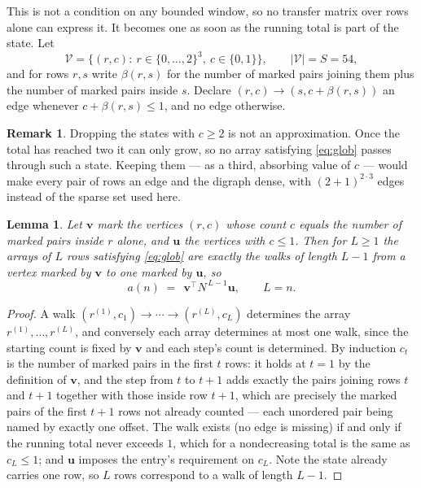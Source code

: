 \documentclass[11pt,a4paper]{article}
\theoremstyle{plain}
\newtheorem{lemma}[theorem]{Lemma}
\theoremstyle{definition}
\newtheorem{remark}[theorem]{Remark}
\begin{document}
This is not a condition on any bounded window, so no transfer matrix over rows alone can
express it. It becomes one as soon as the running total is part of the state. Let
\[
\mathcal V=\bigl\{(r,c):\ r\in\{0,\dots,2\}^{3},\ c\in\{0,1\}\bigr\},
\qquad |\mathcal V|=S=54,
\]
and for rows $r,s$ write $\beta(r,s)$ for the number of marked pairs joining them plus the
number of marked pairs inside $s$. Declare $(r,c)\to(s,c+\beta(r,s))$ an edge whenever
$c+\beta(r,s)\le1$, and no edge otherwise.

\begin{remark}
Dropping the states with $c\ge2$ is not an approximation. Once the total has reached two it
can only grow, so no array satisfying \eqref{eq:glob} passes through such a state. Keeping
them --- as a third, absorbing value of $c$ --- would make every pair of rows an edge and
the digraph dense, with $(2+1)^{2\cdot3}$ edges instead of the sparse set used here.
\end{remark}

\begin{lemma}\label{lem:walk}
Let $\mathbf{v}$ mark the vertices $(r,c)$ whose count $c$ equals the number of marked pairs
inside $r$ alone, and $\mathbf{u}$ the vertices with $c\le1$. Then for $L\ge1$ the arrays
of $L$ rows satisfying \eqref{eq:glob} are exactly the walks of length $L-1$ from a
vertex marked by $\mathbf{v}$ to one marked by $\mathbf{u}$, so
\[
a(n)\;=\;\,\mathbf{v}^{\!\top}N^{\,L-1}\mathbf{u},\qquad L=n .
\]
\end{lemma}

\begin{proof}
A walk $(r^{(1)},c_1)\to\cdots\to(r^{(L)},c_L)$ determines the array
$r^{(1)},\dots,r^{(L)}$, and conversely each array determines at most one walk, since the
starting count is fixed by $\mathbf{v}$ and each step's count is determined. By induction
$c_t$ is the number of marked pairs in the first $t$ rows: it holds at $t=1$ by the
definition of $\mathbf{v}$, and the step from $t$ to $t+1$ adds exactly the pairs joining
rows $t$ and $t+1$ together with those inside row $t+1$, which are precisely the marked
pairs of the first $t+1$ rows not already counted --- each unordered pair being named by
exactly one offset. The walk exists (no edge is missing) if and only if the running total
never exceeds $1$, which for a nondecreasing total is the same as $c_L\le1$; and
$\mathbf{u}$ imposes the entry's requirement on $c_L$. Note the state already carries one
row, so $L$ rows correspond to a walk of length $L-1$.
\end{proof}
\end{document}
